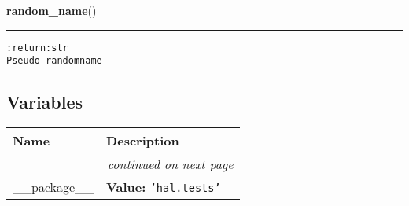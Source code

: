     \label{hal:tests:utils:random_name}

    \vspace{0.5ex}

\hspace{.8\funcindent}\begin{boxedminipage}{\funcwidth}

    \raggedright \textbf{random\_name}()

    \vspace{-1.5ex}

    \rule{\textwidth}{0.5\fboxrule}
\setlength{\parskip}{2ex}
\begin{alltt}

:return: str
    Pseudo-random name
\end{alltt}

\setlength{\parskip}{1ex}
    \end{boxedminipage}



  \subsection{Variables}

    \vspace{-1cm}
\hspace{\varindent}\begin{longtable}{|p{\varnamewidth}|p{\vardescrwidth}|l}
\cline{1-2}
\cline{1-2} \centering \textbf{Name} & \centering \textbf{Description}& \\
\cline{1-2}
\endhead\cline{1-2}\multicolumn{3}{r}{\small\textit{continued on next page}}\\\endfoot\cline{1-2}
\endlastfoot\raggedright \_\-\_\-p\-a\-c\-k\-a\-g\-e\-\_\-\_\- & \raggedright \textbf{Value:} 
{\tt \texttt{'}\texttt{hal.tests}\texttt{'}}&\\
\cline{1-2}
\end{longtable}

